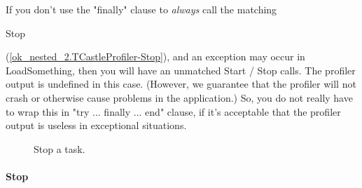 \documentclass{report}
\begin{document}
\begin{list}{}
If you don't use the "finally" clause to \textit{always} call the matching \begin{ttfamily}Stop\end{ttfamily}(\ref{ok_nested_2.TCastleProfiler-Stop}), and an exception may occur in LoadSomething, then you will have an unmatched Start / Stop calls. The profiler output is undefined in this case. (However, we guarantee that the profiler will not crash or otherwise cause problems in the application.) So, you do not really have to wrap this in "try ... finally ... end" clause, if it's acceptable that the profiler output is useless in exceptional situations.

\item[\textbf{See also}]
\begin{description}
\item[\begin{ttfamily}Stop\end{ttfamily}(\ref{ok_nested_2.TCastleProfiler-Stop})] 
Stop a task.
\end{description}


\end{list}
\paragraph*{Stop}\hspace*{\fill}
\end{document}

